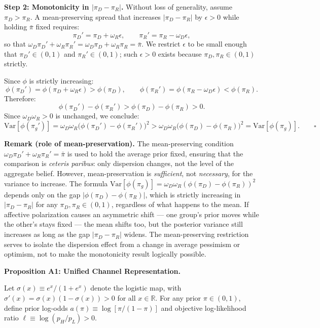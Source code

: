 \documentclass[12pt]{article}
\begin{document}
\medskip
\noindent\textbf{Step 2: Monotonicity in $|\pi_D - \pi_R|$.}
Without loss of generality, assume $\pi_D > \pi_R$. A mean-preserving
spread that increases $|\pi_D - \pi_R|$ by $\epsilon > 0$ while holding
$\bar{\pi}$ fixed requires:
\[
    \pi_D' = \pi_D + \omega_R \epsilon, \qquad
    \pi_R' = \pi_R - \omega_D \epsilon,
\]
so that $\omega_D \pi_D' + \omega_R \pi_R' = \omega_D \pi_D + \omega_R \pi_R = \bar{\pi}$.
We restrict $\epsilon$ to be small enough that $\pi_D' \in (0,1)$ and
$\pi_R' \in (0,1)$; such $\epsilon > 0$ exists because $\pi_D, \pi_R \in
(0,1)$ strictly.

Since $\phi$ is strictly increasing:
\[
    \phi(\pi_D') = \phi(\pi_D + \omega_R\epsilon) > \phi(\pi_D),
    \qquad
    \phi(\pi_R') = \phi(\pi_R - \omega_D\epsilon) < \phi(\pi_R).
\]
Therefore:
\[
    \phi(\pi_D') - \phi(\pi_R')
    > \phi(\pi_D) - \phi(\pi_R) > 0.
\]
Since $\omega_D \omega_R > 0$ is unchanged, we conclude:
\[
    \mathrm{Var}[\phi(\pi_g')]
    = \omega_D \omega_R \bigl(\phi(\pi_D') - \phi(\pi_R')\bigr)^2
    > \omega_D \omega_R \bigl(\phi(\pi_D) - \phi(\pi_R)\bigr)^2
    = \mathrm{Var}[\phi(\pi_g)]. \qquad \square
\]

\medskip
\noindent\textbf{Remark (role of mean-preservation).}
The mean-preserving condition $\omega_D \pi_D' + \omega_R \pi_R' = \bar{\pi}$ is
used to hold the average prior fixed, ensuring that the comparison is
\emph{ceteris paribus}: only dispersion changes, not the level of the aggregate
belief. However, mean-preservation is \emph{sufficient}, not \emph{necessary},
for the variance to increase. The formula $\mathrm{Var}[\phi(\pi_g)] =
\omega_D \omega_R (\phi(\pi_D) - \phi(\pi_R))^2$ depends only on the gap
$|\phi(\pi_D) - \phi(\pi_R)|$, which is strictly increasing in $|\pi_D -
\pi_R|$ for any $\pi_D, \pi_R \in (0,1)$, regardless of what happens to the
mean. If affective polarization causes an asymmetric shift --- one group's prior
moves while the other's stays fixed --- the mean shifts too, but the posterior
variance still increases as long as the gap $|\pi_D - \pi_R|$ widens. The
mean-preserving restriction serves to isolate the dispersion effect from a
change in average pessimism or optimism, not to make the monotonicity result
logically possible.

\bigskip

\noindent\textbf{Proposition A1: Unified Channel Representation.}

\medskip
\noindent Let $\sigma(x) \equiv e^x/(1+e^x)$ denote the logistic map, with
$\sigma'(x) = \sigma(x)(1-\sigma(x)) > 0$ for all $x \in \mathbb{R}$.
For any prior $\pi \in (0,1)$, define prior log-odds $a(\pi) \equiv
\log[\pi/(1-\pi)]$ and objective log-likelihood ratio $\ell \equiv
\log(p_H/p_L) > 0$.
\end{document}
